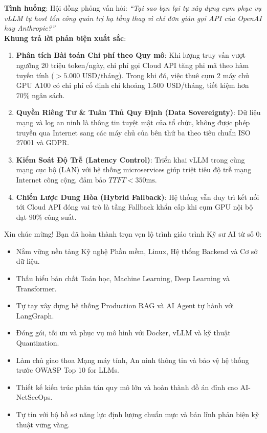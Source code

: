 \begin{interviewbox}
\textbf{Tình huống}: Hội đồng phỏng vấn hỏi: \textit{``Tại sao bạn lại tự xây dựng cụm phục vụ vLLM tự host tốn công quản trị hạ tầng thay vì chỉ đơn giản gọi API của OpenAI hay Anthropic?''}\\
\textbf{Khung trả lời phản biện xuất sắc}:
\begin{enumerate}
  \item \textbf{Phân tích Bài toán Chi phí theo Quy mô}: Khi lượng truy vấn vượt ngưỡng 20 triệu token/ngày, chi phí gọi Cloud API tăng phi mã theo hàm tuyến tính ($> 5.000$ USD/tháng). Trong khi đó, việc thuê cụm 2 máy chủ GPU A100 có chi phí cố định chỉ khoảng $1.500$ USD/tháng, tiết kiệm hơn $70\%$ ngân sách.
  \item \textbf{Quyền Riêng Tư \& Tuân Thủ Quy Định (Data Sovereignty)}: Dữ liệu mạng và log an ninh là thông tin tuyệt mật của tổ chức, không được phép truyền qua Internet sang các máy chủ của bên thứ ba theo tiêu chuẩn ISO 27001 và GDPR.
  \item \textbf{Kiểm Soát Độ Trễ (Latency Control)}: Triển khai vLLM trong cùng mạng cục bộ (LAN) với hệ thống microservices giúp triệt tiêu độ trễ mạng Internet công cộng, đảm bảo $TTFT < 350\text{ms}$.
  \item \textbf{Chiến Lược Dung Hòa (Hybrid Fallback)}: Hệ thống vẫn duy trì kết nối tới Cloud API đóng vai trò là tầng Fallback khẩn cấp khi cụm GPU nội bộ đạt $90\%$ công suất.
\end{enumerate}
\end{interviewbox}

\begin{checkpointbox}
Xin chúc mừng! Bạn đã hoàn thành trọn vẹn lộ trình giáo trình Kỹ sư AI từ số 0:
\begin{itemize}
  \item[$\square$] Nắm vững nền tảng Kỹ nghệ Phần mềm, Linux, Hệ thống Backend và Cơ sở dữ liệu.
  \item[$\square$] Thấu hiểu bản chất Toán học, Machine Learning, Deep Learning và Transformer.
  \item[$\square$] Tự tay xây dựng hệ thống Production RAG và AI Agent tự hành với LangGraph.
  \item[$\square$] Đóng gói, tối ưu và phục vụ mô hình với Docker, vLLM và kỹ thuật Quantization.
  \item[$\square$] Làm chủ giao thoa Mạng máy tính, An ninh thông tin và bảo vệ hệ thống trước OWASP Top 10 for LLMs.
  \item[$\square$] Thiết kế kiến trúc phân tán quy mô lớn và hoàn thành đồ án đỉnh cao AI-NetSecOps.
  \item[$\square$] Tự tin với bộ hồ sơ năng lực định lượng chuẩn mực và bản lĩnh phản biện kỹ thuật vững vàng.
\end{itemize}
\end{checkpointbox}
